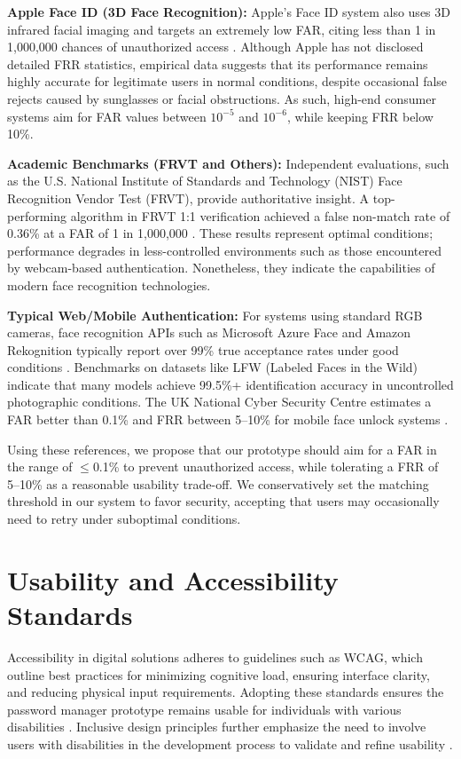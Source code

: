 \textbf{Apple Face ID (3D Face Recognition):} Apple's Face ID system also uses 3D infrared facial imaging and targets an extremely low FAR, citing less than 1 in 1{,}000{,}000 chances of unauthorized access \autocite{BentoFaceID}. Although Apple has not disclosed detailed FRR statistics, empirical data suggests that its performance remains highly accurate for legitimate users in normal conditions, despite occasional false rejects caused by sunglasses or facial obstructions. As such, high-end consumer systems aim for FAR values between $10^{-5}$ and $10^{-6}$, while keeping FRR below 10\%.

\textbf{Academic Benchmarks (FRVT and Others):} Independent evaluations, such as the U.S. National Institute of Standards and Technology (NIST) Face Recognition Vendor Test (FRVT), provide authoritative insight. A top-performing algorithm in FRVT 1:1 verification achieved a false non-match rate of 0.36\% at a FAR of 1 in 1{,}000{,}000 \autocite{ParavisionFRVT}. These results represent optimal conditions; performance degrades in less-controlled environments such as those encountered by webcam-based authentication. Nonetheless, they indicate the capabilities of modern face recognition technologies.

\textbf{Typical Web/Mobile Authentication:} For systems using standard RGB cameras, face recognition APIs such as Microsoft Azure Face and Amazon Rekognition typically report over 99\% true acceptance rates under good conditions \autocite{IJCAFace}. Benchmarks on datasets like LFW (Labeled Faces in the Wild) indicate that many models achieve 99.5\%+ identification accuracy in uncontrolled photographic conditions. The UK National Cyber Security Centre estimates a FAR better than 0.1\% and FRR between 5--10\% for mobile face unlock systems \autocite{BentoFaceID,MicrosoftHelloDocs}.

Using these references, we propose that our prototype should aim for a FAR in the range of $\leq$0.1\% to prevent unauthorized access, while tolerating a FRR of 5--10\% as a reasonable usability trade-off. We conservatively set the matching threshold in our system to favor security, accepting that users may occasionally need to retry under suboptimal conditions.

\section{Usability and Accessibility Standards}
Accessibility in digital solutions adheres to guidelines such as WCAG, which outline best practices for minimizing cognitive load, ensuring interface clarity, and reducing physical input requirements. Adopting these standards ensures the password manager prototype remains usable for individuals with various disabilities \autocite{Brewer2023}. Inclusive design principles further emphasize the need to involve users with disabilities in the development process to validate and refine usability \autocite{Lazar2015}.
